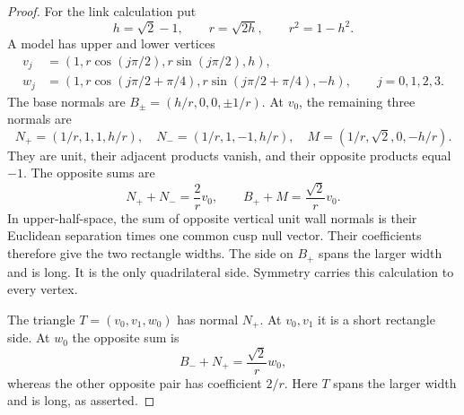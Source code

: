 \begin{proof}
For the link calculation put
\[
 h=\sqrt2-1,\qquad r=\sqrt{2h},\qquad r^2=1-h^2.
\]
A model has upper and lower vertices
\begin{align*}
 v_j&=(1,r\cos(j\pi/2),r\sin(j\pi/2),h),\\
 w_j&=(1,r\cos(j\pi/2+\pi/4),r\sin(j\pi/2+\pi/4),-h),
 \qquad j=0,1,2,3.
\end{align*}
The base normals are \(B_\pm=(h/r,0,0,\pm1/r)\).
At \(v_0\), the remaining three normals are
\[
 N_+=(1/r,1,1,h/r),\quad
 N_-=(1/r,1,-1,h/r),\quad
 M=(1/r,\sqrt2,0,-h/r).
\]
They are unit, their adjacent products vanish, and their opposite
products equal \(-1\). The opposite sums are
\[
 N_++N_-=\frac2r v_0,\qquad
 B_++M=\frac{\sqrt2}{r}v_0.
\]
In upper-half-space, the sum of opposite vertical unit wall normals
is their Euclidean separation times one common cusp null vector.
Their coefficients therefore give the two rectangle widths.
The side on \(B_+\) spans the larger width and is long.
It is the only quadrilateral side. Symmetry carries this calculation
to every vertex.

The triangle \(T=(v_0,v_1,w_0)\) has normal \(N_+\).
At \(v_0,v_1\) it is a short rectangle side. At \(w_0\) the
opposite sum is
\[
 B_-+N_+=\frac{\sqrt2}{r}w_0,
\]
whereas the other opposite pair has coefficient \(2/r\).
Here \(T\) spans the larger width and is long, as asserted.
\end{proof}

